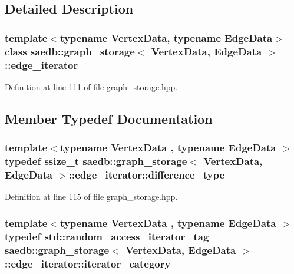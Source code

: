 \subsection{Detailed Description}
\subsubsection*{template$<$typename Vertex\-Data, typename Edge\-Data$>$class saedb\-::graph\-\_\-storage$<$ Vertex\-Data, Edge\-Data $>$\-::edge\-\_\-iterator}



Definition at line 111 of file graph\-\_\-storage.\-hpp.



\subsection{Member Typedef Documentation}
\hypertarget{classsaedb_1_1graph__storage_1_1edge__iterator_a36e4780cec6028b4af8cb4e34b8de5b4}{
\subsubsection[{difference\-\_\-type}]{\setlength{\rightskip}{0pt plus 5cm}template$<$typename Vertex\-Data , typename Edge\-Data $>$ typedef ssize\-\_\-t {\bf saedb\-::graph\-\_\-storage}$<$ Vertex\-Data, Edge\-Data $>$\-::{\bf edge\-\_\-iterator\-::difference\-\_\-type}}}\label{d8/d8a/classsaedb_1_1graph__storage_1_1edge__iterator_a36e4780cec6028b4af8cb4e34b8de5b4}


Definition at line 115 of file graph\-\_\-storage.\-hpp.

\hypertarget{classsaedb_1_1graph__storage_1_1edge__iterator_a4fac79a017431f05a075583324643f7e}{
\subsubsection[{iterator\-\_\-category}]{\setlength{\rightskip}{0pt plus 5cm}template$<$typename Vertex\-Data , typename Edge\-Data $>$ typedef std\-::random\-\_\-access\-\_\-iterator\-\_\-tag {\bf saedb\-::graph\-\_\-storage}$<$ Vertex\-Data, Edge\-Data $>$\-::{\bf edge\-\_\-iterator\-::iterator\-\_\-category}}}\label{d8/d8a/classsaedb_1_1graph__storage_1_1edge__iterator_a4fac79a017431f05a075583324643f7e}


